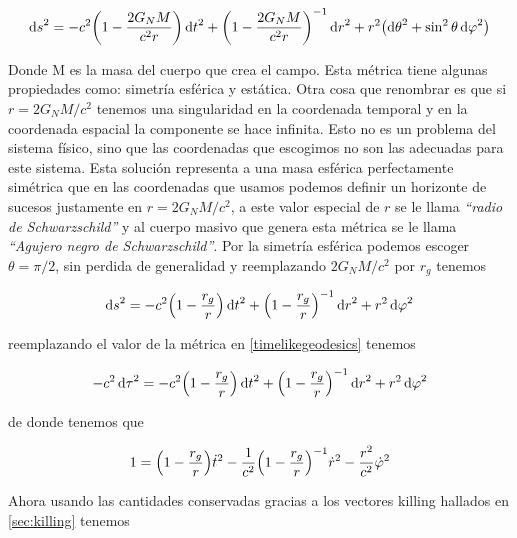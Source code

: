 \documentclass[../Main.tex]{subfiles}
\begin{document}
\begin{equation}
    \dd{s}^{2} = -c^{2}\qty(1-\dfrac{2G_{N}M}{c^{2}r})\dd{t}^{2} + \qty(1-\dfrac{2G_{N}M}{c^{2}r})^{-1}\dd{r}^{2} + r^{2}\qty(\dd{\theta}^{2}+\sin^{2}{\theta}\dd{\varphi}^{2})
\end{equation}

Donde M es la masa del cuerpo que crea el campo. Esta métrica tiene algunas propiedades como: simetría esférica y estática. Otra cosa que renombrar es que si $r = 2G_{N}M/c^{2}$ tenemos una singularidad en la coordenada temporal y en la coordenada espacial la componente se hace infinita. Esto no es un problema del sistema físico, sino que las coordenadas que escogimos no son las adecuadas para este sistema. 
Esta solución representa a una masa esférica perfectamente simétrica que en las coordenadas que usamos podemos definir un horizonte de sucesos justamente en $r = 2G_{N}M/c^{2}$, a este valor especial de $r$ se le llama \textit{``radio de Schwarzschild''} y al cuerpo masivo que genera esta métrica se le llama \textit{``Agujero negro de Schwarzschild''}. Por la simetría esférica podemos escoger $\theta = \pi/2$, sin perdida de generalidad y reemplazando $2G_{N}M/c^{2}$ por $r_{g}$ tenemos

\begin{equation}
    \dd{s}^{2} = -c^{2}\qty(1-\dfrac{r_{g}}{r})\dd{t}^{2} + \qty(1-\dfrac{r_{g}}{r})^{-1}\dd{r}^{2} + r^{2}\dd{\varphi}^{2}
\end{equation}

reemplazando el valor de la métrica en \eqref{timelikegeodesics} tenemos

\begin{equation}
    -c^{2}\dd{\tau}^{2} = -c^{2}\qty(1-\dfrac{r_{g}}{r})\dd{t}^{2} + \qty(1-\dfrac{r_{g}}{r})^{-1}\dd{r}^{2} + r^{2}\dd{\varphi}^{2}
    \label{Schwarzschildgeodesics}
\end{equation}

de donde tenemos que

\begin{equation*}
    1 = \qty(1-\dfrac{r_{g}}{r})\dot{t}^{2} - \dfrac{1}{c^{2}}\qty(1-\dfrac{r_{g}}{r})^{-1}\dot{r}^{2} - \dfrac{r^{2}}{c^{2}}\dot{\varphi}^{2} 
\end{equation*}

Ahora usando las cantidades conservadas gracias a los vectores killing hallados en \ref{sec:killing} tenemos
\end{document}
